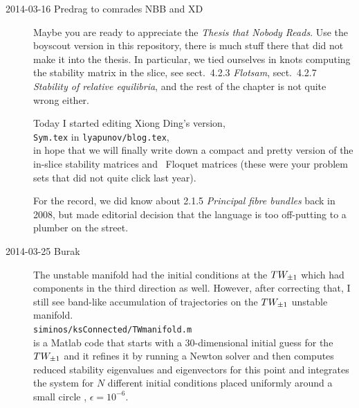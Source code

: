 \begin{description}
\item[2014-03-16 Predrag to comrades NBB and XD]
Maybe you are ready to appreciate
the \emph{
           {Thesis that Nobody Reads}}. Use the boyscout version in
this repository, there is much stuff there that did not make it into the
thesis. In particular, we tied ourselves in knots computing the stability
matrix in the slice, see sect.~4.2.3 \emph{Flotsam}, sect.~4.2.7
\emph{Stability of relative equilibria}, and the rest of the chapter is
not quite wrong either.

Today I started editing Xiong Ding's version,
\\
\texttt{Sym.tex} in \texttt{lyapunov/blog.tex},
\\
in hope that we will finally write down a compact and pretty version of
the in-slice stability matrices and \rpo\ Floquet matrices (these were
your problem sets that did not quite click last year).

For the record, we did know about 2.1.5 \emph{Principal fibre bundles}
back in 2008, but made editorial decision that the language is too
off-putting to a plumber on the street.

\item[2014-03-25 Burak] The unstable manifold 
had the initial conditions at the $TW_{\pm1}$ which had components
in the third direction as well. However, after correcting that, I still see
band-like accumulation of trajectories on the $TW_{\pm1}$
unstable manifold.
\\
\texttt{siminos/ksConnected/TWmanifold.m}
\\
 is a Matlab code that starts with
a $30$-dimensional initial guess for the $TW_{\pm1}$ and it refines it by running
a Newton solver and then computes reduced stability eigenvalues and eigenvectors
for this point and integrates the system for $N$ different initial conditions
placed uniformly around a small circle ,
 $\epsilon = 10^{-6}$.



\end{description}

